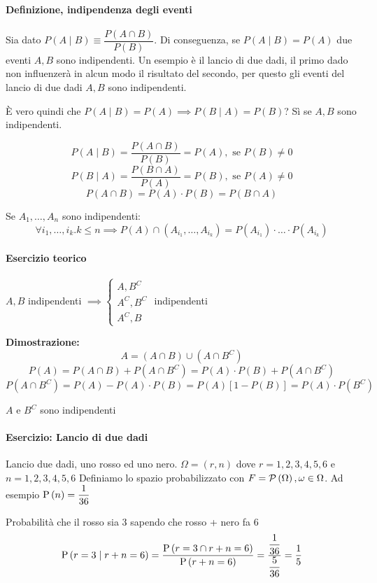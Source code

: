 \paragraph{Definizione, indipendenza degli eventi} 

Sia dato $ P(A \mid B) \equiv \dfrac{P(A \cap B)}{P(B)} $. Di conseguenza, se $ P(A \mid B) = P(A) $ due eventi $ A,B $ sono indipendenti. Un esempio è il lancio di due dadi, il primo dado non influenzerà in alcun modo il risultato del secondo, per questo gli eventi del lancio di due dadi $ A,B $ sono indipendenti.

È vero quindi che $ P(A \mid B) = P(A) \implies P(B \mid A) = P(B) $? Sì se $ A,B $ sono indipendenti.

\[ P(A \mid B) = \dfrac{P(A \cap B)}{P(B)} = P(A), \text{ se } P(B) \neq 0 \]
\[ P(B \mid A) = \dfrac{P(B \cap A)}{P(A)} = P(B), \text{ se } P(A) \neq 0 \]
\[ P(A \cap B)  = P(A) \cdot P(B) = P(B \cap A) \]

Se $ A_1, \dots, A_n $ sono indipendenti:
\[ \forall i_1, \dots, i_k . k \leq n  \implies P(A)\cap \left(A_{i_1},\dots,A_{i_k}\right) = P(A_{i_1}) \cdot \dots \cdot P(A_{i_k}) \] 

\paragraph{Esercizio teorico}

$ A, B $ indipendenti $ \implies \begin{cases}
A, B^C \\
A^C, B^C \\
A^C, B
\end{cases} $ indipendenti

\textbf{Dimostrazione:}
\[ A = (A \cap B) \cup (A \cap B^C)  \]
\[ P(A) = P(A \cap B) + P(A \cap B^C) = P(A) \cdot P(B) + P(A \cap B^C) \]
\[ P(A \cap B^C) = P(A) - P(A) \cdot P(B) = P(A)\left[1 - P(B)\right] = P(A) \cdot P(B^C) \]

$ A $ e $ B^C $ sono indipendenti \enddim

\paragraph{Esercizio: Lancio di due dadi}
Lancio due dadi, uno rosso ed uno nero.
$ \Omega = (r, n) $ dove $ r = 1,2,3,4,5,6 $ e $ n = 1,2,3,4,5,6 $ 
Definiamo lo spazio probabilizzato con $ F = \mathcal{P}\left(\Omega\right), \omega \in \Omega $. Ad esempio $ \text{P}\left(n\right) = \dfrac{1}{36} $

Probabilità che il rosso sia 3 sapendo che rosso + nero fa 6
\[ \text{P}\left(r=3  \mid  r+n = 6\right) = \dfrac{\text{P}\left(r=3 \cap r + n = 6\right)}{\text{P}\left(r+n=6\right)} = \dfrac{\dfrac{1}{36}}{\dfrac{5}{36}} = \dfrac{1}{5}\] 

